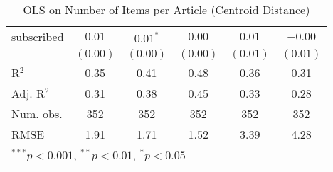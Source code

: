 \begin{table}[!h]
\begin{center}
\begin{tabular}{l c c c c c }
subscribed              & $0.01$       & $0.01^{*}$   & $0.00$       & $0.01$       & $-0.00$      \\
                        & $(0.00)$     & $(0.00)$     & $(0.00)$     & $(0.01)$     & $(0.01)$     \\
\midrule
R$^2$                   & 0.35         & 0.41         & 0.48         & 0.36         & 0.31         \\
Adj. R$^2$              & 0.31         & 0.38         & 0.45         & 0.33         & 0.28         \\
Num. obs.               & 352          & 352          & 352          & 352          & 352          \\
RMSE                    & 1.91         & 1.71         & 1.52         & 3.39         & 4.28         \\
\bottomrule
\multicolumn{6}{l}{\scriptsize{$^{***}p<0.001$, $^{**}p<0.01$, $^*p<0.05$}}
\end{tabular}
\caption{OLS on Number of Items per Article (Centroid Distance)}
\label{table:coefficients}
\end{center}
\end{table}
